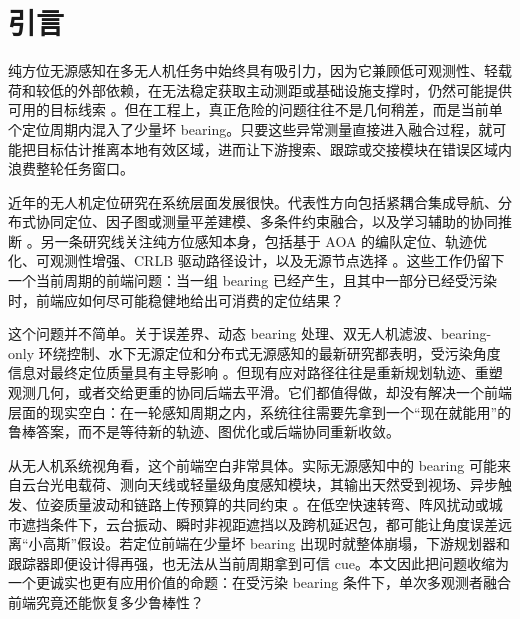 \documentclass[drones,article,submit,moreauthors]{Definitions/mdpi}
\begin{document}
\section{引言}

纯方位无源感知在多无人机任务中始终具有吸引力，因为它兼顾低可观测性、轻载荷和较低的外部依赖，在无法稳定获取主动测距或基础设施支撑时，仍然可能提供可用的目标线索 \cite{avola2024uav,liu2025survey,kramaric2025comprehensive,gao2023scalable,li2025bearing}。但在工程上，真正危险的问题往往不是几何稍差，而是当前单个定位周期内混入了少量坏 bearing。只要这些异常测量直接进入融合过程，就可能把目标估计推离本地有效区域，进而让下游搜索、跟踪或交接模块在错误区域内浪费整轮任务窗口。

近年的无人机定位研究在系统层面发展很快。代表性方向包括紧耦合集成导航、分布式协同定位、因子图或测量平差建模、多条件约束融合，以及学习辅助的协同推断 \cite{yang2020tightly,dai2022uav,yang2024distributed,qian2025cooperative,li2025tcdrl,li2026formation,liu2026high,ding2026set,jia2024composite}。另一条研究线关注纯方位感知本身，包括基于 AOA 的编队定位、轨迹优化、可观测性增强、CRLB 驱动路径设计，以及无源节点选择 \cite{kang2024aoa,huang2025emcompat,xing2025node,zou2024revisit,chen2025variable,wang2025bio,dogancay2024bayesian}。这些工作仍留下一个当前周期的前端问题：当一组 bearing 已经产生，且其中一部分已经受污染时，前端应如何尽可能稳健地给出可消费的定位结果？

这个问题并不简单。关于误差界、动态 bearing 处理、双无人机滤波、bearing-only 环绕控制、水下无源定位和分布式无源感知的最新研究都表明，受污染角度信息对最终定位质量具有主导影响 \cite{chen2025error,luo2025dynamicbearing,yin2025dual,dou2025moving,mei2024bearing,zong2025distributed,yu2025passive,wu2026bearing,zhou2026direct,liu2026sensing}。但现有应对路径往往是重新规划轨迹、重塑观测几何，或者交给更重的协同后端去平滑。它们都值得做，却没有解决一个前端层面的现实空白：在一轮感知周期之内，系统往往需要先拿到一个“现在就能用”的鲁棒答案，而不是等待新的轨迹、图优化或后端协同重新收敛。

从无人机系统视角看，这个前端空白非常具体。实际无源感知中的 bearing 可能来自云台光电载荷、测向天线或轻量级角度感知模块，其输出天然受到视场、异步触发、位姿质量波动和链路上传预算的共同约束 \cite{chen2025research,peng2024trajectory,zhou2026target,zhang2026multi}。在低空快速转弯、阵风扰动或城市遮挡条件下，云台振动、瞬时非视距遮挡以及跨机延迟包，都可能让角度误差远离“小高斯”假设。若定位前端在少量坏 bearing 出现时就整体崩塌，下游规划器和跟踪器即便设计得再强，也无法从当前周期拿到可信 cue。本文因此把问题收缩为一个更诚实也更有应用价值的命题：在受污染 bearing 条件下，单次多观测者融合前端究竟还能恢复多少鲁棒性？
\end{document}
